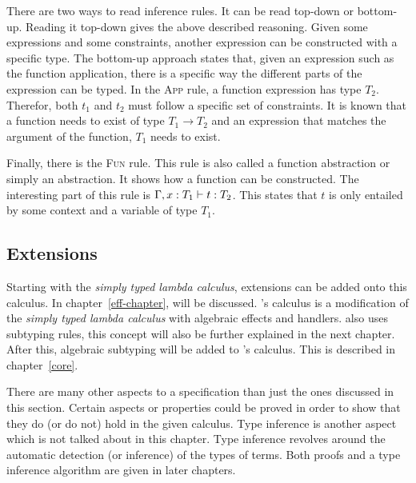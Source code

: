 There are two ways to read inference rules. It can be read top-down or bottom-up. Reading it top-down gives the above described reasoning. Given some expressions and some constraints, another expression can be constructed with a specific type. The bottom-up approach states that, given an expression such as the function application, there is a specific way the different parts of the expression can be typed. In the \textsc{App} rule, a function expression has type $T_2$. Therefor, both $t_1$ and $t_2$ must follow a specific set of constraints. It is known that a function needs to exist of type $T_1 \to T_2$ and an expression that matches the argument of the function, $T_1$ needs to exist. \cite{pierce2002types}

Finally, there is the \textsc{Fun} rule. This rule is also called a function abstraction or simply an abstraction. It shows how a function can be constructed. The interesting part of this rule is $\Gamma, x \mathrel{:} T_1 \vdash t \mathrel{:} T_2$. This states that $t$ is only entailed by some context and a variable of type $T_1$.

\subsection{Extensions}
Starting with the \textit{simply typed lambda calculus}, extensions can be added onto this calculus. In chapter~\ref{eff-chapter}, \eff will be discussed. \eff's calculus is a modification of the \textit{simply typed lambda calculus} with algebraic effects and handlers. \eff also uses subtyping rules, this concept will also be further explained in the next chapter. After this, algebraic subtyping will be added to \eff's calculus. This is described in chapter~\ref{core}.

There are many other aspects to a specification than just the ones discussed in this section. Certain aspects or properties could be proved in order to show that they do (or do not) hold in the given calculus. Type inference is another aspect which is not talked about in this chapter. Type inference revolves around the automatic detection (or inference) of the types of terms. Both proofs and a type inference algorithm are given in later chapters. 